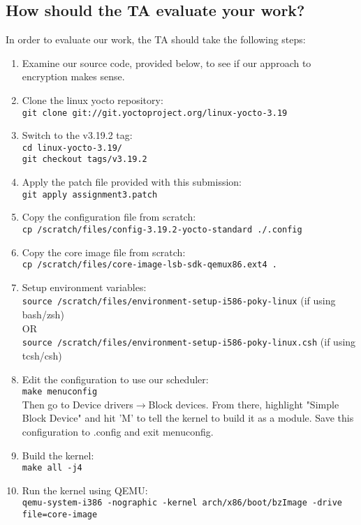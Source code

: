 \documentclass[letterpaper,10pt,titlepage,draftclsnofoot,onecolumn]{article}
\begin{document}
\subsection{How should the TA evaluate your work?}
In order to evaluate our work, the TA should take the following steps:
\begin{enumerate}
\item Examine our source code, provided below, to see if our approach to encryption makes sense.
\item Clone the linux yocto repository:\\
\texttt{git clone git://git.yoctoproject.org/linux-yocto-3.19}
\item Switch to the v3.19.2 tag:\\
\texttt{cd linux-yocto-3.19/} \\
\texttt{git checkout tags/v3.19.2}
\item Apply the patch file provided with this submission:\\
\texttt{git apply assignment3.patch}
\item Copy the configuration file from scratch:\\
\texttt{cp /scratch/files/config-3.19.2-yocto-standard ./.config}
\item Copy the core image file from scratch:\\
\texttt{cp /scratch/files/core-image-lsb-sdk-qemux86.ext4 .}
\item Setup environment variables:\\
\texttt{source /scratch/files/environment-setup-i586-poky-linux} (if using bash/zsh) \\
OR \\
\texttt{source /scratch/files/environment-setup-i586-poky-linux.csh} (if using tcsh/csh)
\item Edit the configuration to use our scheduler:\\
\texttt{make menuconfig} \\
Then go to Device drivers$\rightarrow$Block devices. From there, highlight "Simple Block Device" and hit 'M' to tell the kernel to build it as a module. Save this configuration to .config and exit menuconfig.
\item Build the kernel:\\
\texttt{make all -j4}
\item Run the kernel using QEMU:\\
\texttt{qemu-system-i386 -nographic -kernel arch/x86/boot/bzImage -drive file=core-image}\\

\end{enumerate}
\end{document}
